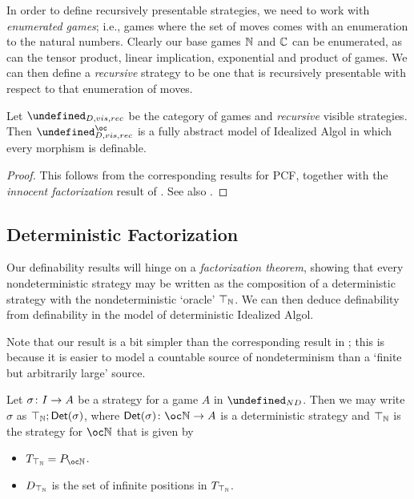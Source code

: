 \documentclass[sigplan,10pt,review]{acmart}\settopmatter{printfolios=true,printccs=false,printacmref=false}
\let\G\undefined
\begin{document}
In order to define recursively presentable strategies, we need to work with \emph{enumerated games}; i.e., games where the set of moves comes with an enumeration to the natural numbers.  
Clearly our base games $\mathbb{N}$ and $\mathbb{C}$ can be enumerated, as can the tensor product, linear implication, exponential and product of games.  
We can then define a \emph{recursive} strategy to be one that is recursively presentable with respect to that enumeration of moves.

\begin{proposition}
  Let $\G_{D,vis,rec}$ be the category of games and \emph{recursive} visible strategies.  
  Then $\G_{D,vis,rec}^\oc$ is a fully abstract model of Idealized Algol in which every morphism is definable.
\end{proposition}
\begin{proof}
  This follows from the corresponding results for PCF, together with the \emph{innocent factorization} result of \cite{SamsonGuyIAPassive}.  
  See also \cite{MurawskiUniversality}.
\end{proof}

\subsection{Deterministic Factorization}

Our definability results will hinge on a \emph{factorization theorem}, showing that every nondeterministic strategy may be written as the composition of a deterministic strategy with the nondeterministic `oracle' $\top_{\mathbb{N}}$.  
We can then deduce definability from definability in the model of deterministic Idealized Algol.

Note that our result is a bit simpler than the corresponding result in \cite{mcCHFiniteND}; this is because it is easier to model a countable source of nondeterminism than a `finite but arbitrarily large' source.

\begin{proposition}
  Let $\sigma\colon I \to A$ be a strategy for a game $A$ in $\G_{ND}$.
  Then we may write $\sigma$ as $\top_{\mathbb{N}};\mathsf{Det}(\sigma)$, where $\Det(\sigma)\from \oc\bN\to A$ is a deterministic strategy and $\top_{\mathbb{N}}$ is the strategy for $\oc\bN$ that is given by
  \begin{itemize}
    \item $T_{\top_{\bN}}=P_{\oc\bN}$.
    \item $D_{\top_{\mathbb{N}}}$ is the set of infinite positions in $T_{\top_{\mathbb{N}}}$.
  \end{itemize}
\end{proposition}
\end{document}
